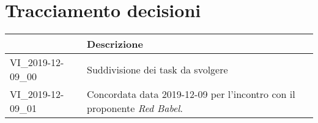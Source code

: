 \section{Tracciamento decisioni}
\renewcommand{\arraystretch}{1.8}

  \begin{longtable}{|p{5cm}|p{9cm}|}
    \hline

    \rowcolor{header}
    \centering{\textbf{Codice}} &  \textbf{Descrizione}\\

    \hline

    VI\_2019-12-09\_00 & Suddivisione dei task da svolgere  \\
    VI\_2019-12-09\_01 & Concordata data 2019-12-09 per l'incontro con il proponente \textit{Red Babel}.  \\

    \hline
  \end{longtable}

